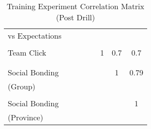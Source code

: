 \begin{table}[htbp]
{\begin{tabular}{lccccccc}
vs Expectations        &                  &                 &                  &                        &            &                &                \\
                       &                  &                 &                  &                        &            &                &                \\
Team Click             &                  &                 &                  &                        & 1          & 0.7            & 0.7            \\
                       &                  &                 &                  &                        &            &                &                \\
                       &                  &                 &                  &                        &            &                &                \\
Social Bonding         &                  &                 &                  &                        &            & 1              & 0.79           \\
(Group)                &                  &                 &                  &                        &            &                &                \\
                       &                  &                 &                  &                        &            &                &                \\
Social Bonding         &                  &                 &                  &                        &            &                & 1              \\
(Province)             &                  &                 &                  &                        &            &                &               
          \\
\bottomrule     
\end{tabular}}
\caption{Training Experiment Correlation Matrix (Post Drill)}
\label{tab:expcorr_postdrill}
\end{table}
